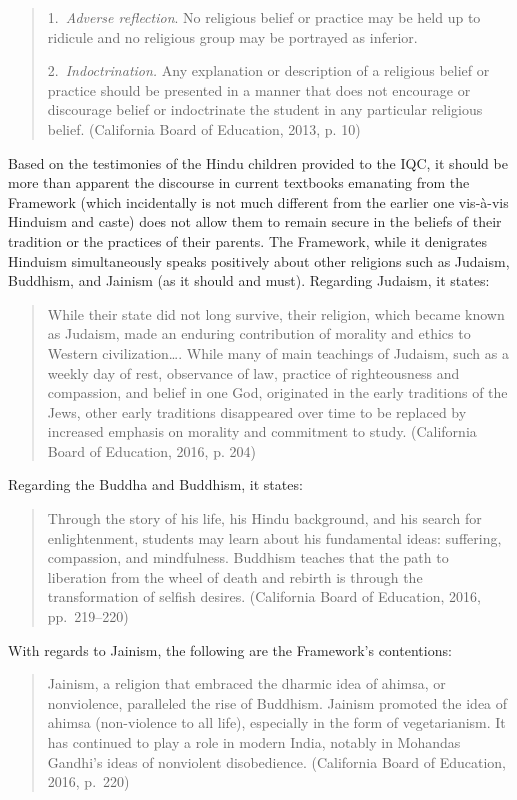 \begin{quote}
1.\ \textit{Adverse reflection}. No religious belief or practice may be held up to ridicule and no religious group may be portrayed as inferior.

2.\ \textit{Indoctrination.} Any explanation or description of a religious belief or practice should be presented in a manner that does not encourage or discourage belief or indoctrinate the student in any particular religious belief. (California Board of Education, 2013, p. 10)
\end{quote}

Based on the testimonies of the Hindu children provided to the IQC, it should be more than apparent the discourse in current textbooks emanating from the Framework (which incidentally is not much different from the earlier one vis-à-vis Hinduism and caste) does not allow them to remain secure in the beliefs of their tradition or the practices of their parents. The Framework, while it denigrates Hinduism simultaneously speaks positively about other religions such as Judaism, Buddhism, and Jainism (as it should and must). Regarding Judaism, it states:
\begin{quote}
While their state did not long survive, their religion, which became known as Judaism, made an enduring contribution of morality and ethics to Western civilization…. While many of main teachings of Judaism, such as a weekly day of rest, observance of law, practice of righteousness and compassion, and belief in one God, originated in the early traditions of the Jews, other early traditions disappeared over time to be replaced by increased emphasis on morality and commitment to study. (California Board of Education, 2016, p. 204)
\end{quote}
Regarding the Buddha and Buddhism, it states: 
\begin{quote}
Through the story of his life, his Hindu background, and his search for enlightenment, students may learn about his fundamental ideas: suffering, compassion, and mindfulness. Buddhism teaches that the path to liberation from the wheel of death and rebirth is through the transformation of selfish desires. (California Board of Education, 2016, pp.\ 219--220) 
\end{quote}
With regards to Jainism, the following are the Framework’s contentions:
\begin{quote}
Jainism, a religion that embraced the dharmic idea of ahimsa, or nonviolence, paralleled the rise of Buddhism. Jainism promoted the idea of ahimsa (non-violence to all life), especially in the form of vegetarianism. It has continued to play a role in modern India, notably in Mohandas Gandhi’s ideas of nonviolent disobedience. (California Board of Education, 2016, p.\ 220)
\end{quote}
